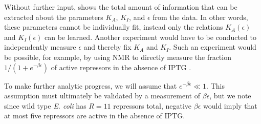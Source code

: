 Without further input, \fref[SIfig5] shows the total amount of
information that can be extracted about the parameters $K_A$, $K_I$, and
$\epsilon$ from the data. In other words, these parameters cannot be
individually fit, instead only the relations $K_A(\epsilon)$ and $K_I(\epsilon)$
can be learned. Another experiment would have to be conducted to independently
measure $\epsilon$ and thereby fix $K_A$ and $K_I$. Such an experiment would be
possible, for example, by using NMR to directly measure the fraction
$1/(1+e^{-\beta\epsilon})$ of active repressors in the absence of IPTG
\cite{Gardino2003, Boulton2016}.

To make further analytic progress, we will assume that $e^{- \beta \epsilon} \ll
1$.  This assumption must ultimately be validated by a measurement of $\beta
\epsilon$, but we note since wild type \textit{E. coli} has $R=11$ repressors
total, negative $\beta \epsilon$ would imply that at most five repressors are
active in the absence of IPTG.

